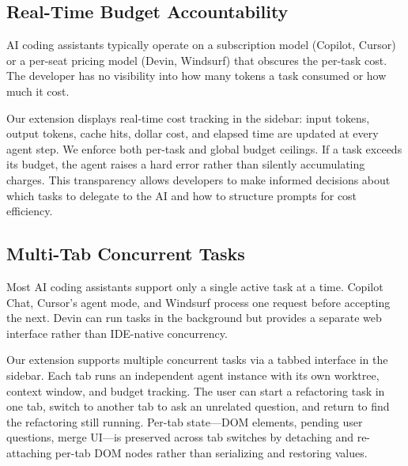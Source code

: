 \documentclass{article}
\begin{document}
\subsection{Real-Time Budget Accountability}
\label{sec:budget-feature}

AI coding assistants typically operate on a subscription model
(Copilot, Cursor) or a per-seat pricing model (Devin, Windsurf) that
obscures the per-task cost.  The developer has no visibility into how
many tokens a task consumed or how much it cost.

Our extension displays real-time cost tracking in the sidebar: input
tokens, output tokens, cache hits, dollar cost, and elapsed time are
updated at every agent step.  We enforce both per-task and global
budget ceilings.  If a task exceeds its budget, the agent raises a
hard error rather than silently accumulating charges.  This
transparency allows developers to make informed decisions about which
tasks to delegate to the AI and how to structure prompts for cost
efficiency.

\subsection{Multi-Tab Concurrent Tasks}
\label{sec:multi-tab}

Most AI coding assistants support only a single active task at a time.
Copilot Chat, Cursor's agent mode, and Windsurf process one request
before accepting the next.  Devin can run tasks in the background but
provides a separate web interface rather than IDE-native concurrency.

Our extension supports multiple concurrent tasks via a tabbed
interface in the sidebar.  Each tab runs an independent agent instance
with its own worktree, context window, and budget tracking.  The user
can start a refactoring task in one tab, switch to another tab to ask
an unrelated question, and return to find the refactoring still
running.  Per-tab state---DOM elements, pending user questions, merge
UI---is preserved across tab switches by detaching and re-attaching
per-tab DOM nodes rather than serializing and restoring values.

\end{document}
